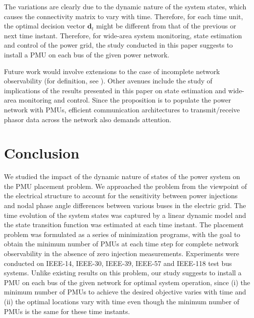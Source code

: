\documentclass[10pt,journal,twocolumn]{IEEEtran}\IEEEoverridecommandlockouts
\begin{document}
The variations are clearly due to the dynamic nature of the system states, which causes the connectivity matrix to vary with time. Therefore, for each time unit, the optimal decision vector $\bm{d}_t$ might be different from that of the previous or next time instant. Therefore, for wide-area system monitoring, state estimation and control of the power grid, the study conducted in this paper suggests to install a PMU on each bus of the given power network.

Future work would involve extensions to the case of incomplete network observability (for definition, see \cite{Nuqui2005}). Other avenues include the study of implications of the results presented in this paper on state estimation and wide-area monitoring and control. Since the proposition is to populate the power network with PMUs, efficient communication architectures to transmit/receive phasor data across the network also demands attention.

\section{Conclusion}\label{sec:conclusion}
We studied the impact of the dynamic nature of states of the power system on the PMU placement problem. We approached the problem from the viewpoint of the electrical structure to account for the sensitivity between power injections and nodal phase angle differences between various buses in the electric grid. The time evolution of the system states was captured by a linear dynamic model and the state transition function was estimated at each time instant. The placement problem was formulated as a series of minimization programs, with the goal to obtain the minimum number of PMUs at each time step for complete network observability in the absence of zero injection measurements. Experiments were conducted on IEEE-14, IEEE-30, IEEE-39, IEEE-57 and IEEE-118 test bus systems. Unlike existing results on this problem, our study suggests to install a PMU on each bus of the given network for optimal system operation, since (i) the minimum number of PMUs to achieve the desired objective varies with time and (ii) the optimal locations vary with time even though the minimum number of PMUs is the same for these time instants.





\raggedbottom
\end{document}
